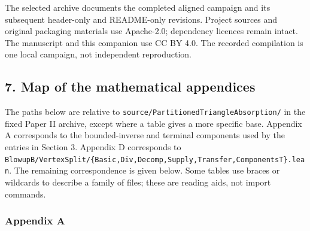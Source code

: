 \documentclass[english,11pt,a4paper]{article}
\begin{document}
The selected archive documents the completed aligned campaign and its subsequent header-only and README-only revisions. Project sources and original packaging materials use Apache-2.0; dependency licences remain intact. The manuscript and this companion use CC BY 4.0. The recorded compilation is one local campaign, not independent reproduction.


\subsection{7. Map of the mathematical appendices}\label{map-of-the-mathematical-appendices}

The paths below are relative to \texttt{source/\allowbreak{}Parti\allowbreak{}tioned\allowbreak{}Triang\allowbreak{}le\allowbreak{}Absorption\allowbreak{}/\allowbreak{}} in the fixed Paper II archive, except where a table gives a more specific base. Appendix A corresponds to the bounded-inverse and terminal components used by the entries in Section 3. Appendix D corresponds to \texttt{Blowup\allowbreak{}B/\allowbreak{}Vert\allowbreak{}ex\allowbreak{}Split/\allowbreak{}\{\allowbreak{}Bas\allowbreak{}ic,\allowbreak{}Div,\allowbreak{}Decom\allowbreak{}p,\allowbreak{}Supply,\allowbreak{}Tra\allowbreak{}nsfer,\allowbreak{}Compon\allowbreak{}ents\allowbreak{}T\}\allowbreak{}.\allowbreak{}lean}. The remaining correspondence is given below. Some tables use braces or wildcards to describe a family of files; these are reading aids, not import commands.

\subsubsection{Appendix A}\label{appendix-a}
\end{document}
